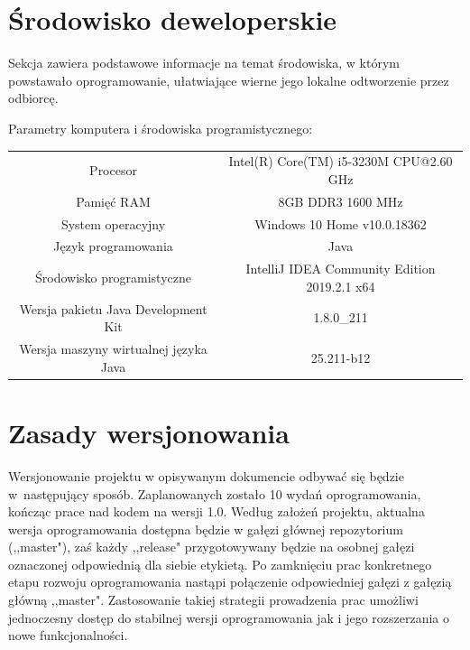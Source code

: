 \documentclass[10pt,oneside]{article}
\begin{document}
	\section{Środowisko deweloperskie}
	Sekcja zawiera podstawowe informacje na temat środowiska, w którym powstawało oprogramowanie, ułatwiające wierne jego lokalne odtworzenie przez odbiorcę.
	\begin{center}
		Parametry komputera i środowiska programistycznego:
		\newline \newline
		\begin{tabular}{|c|c|} \hline
			Procesor & Intel(R) Core(TM) i5-3230M CPU@2.60 GHz
			\\[10pt] Pamięć RAM & 8GB DDR3 1600 MHz
			\\[10pt] System operacyjny & Windows 10 Home v10.0.18362
			\\[10pt] Język programowania & Java
			\\[10pt] Środowisko programistyczne & IntelliJ IDEA Community Edition 2019.2.1 x64
			\\[10pt] Wersja pakietu Java Development Kit & 1.8.0\_211
			\\[10pt] Wersja maszyny wirtualnej języka Java & 25.211-b12\\ \hline
		\end{tabular}
	\end{center}
	
	\section{Zasady wersjonowania}
	Wersjonowanie projektu w opisywanym dokumencie odbywać się będzie w~następujący sposób. Zaplanowanych zostało 10 wydań oprogramowania, kończąc prace nad kodem na wersji 1.0. Według założeń projektu, aktualna wersja oprogramowania dostępna będzie w gałęzi głównej repozytorium (,,master"), zaś każdy ,,release" przygotowywany będzie na osobnej gałęzi oznaczonej odpowiednią dla siebie etykietą. Po zamknięciu prac konkretnego etapu rozwoju oprogramowania nastąpi połączenie odpowiedniej gałęzi z gałęzią główną ,,master". Zastosowanie takiej strategii prowadzenia prac umożliwi jednoczesny dostęp do stabilnej wersji oprogramowania jak i jego rozszerzania o nowe funkcjonalności.
	
\end{document}
